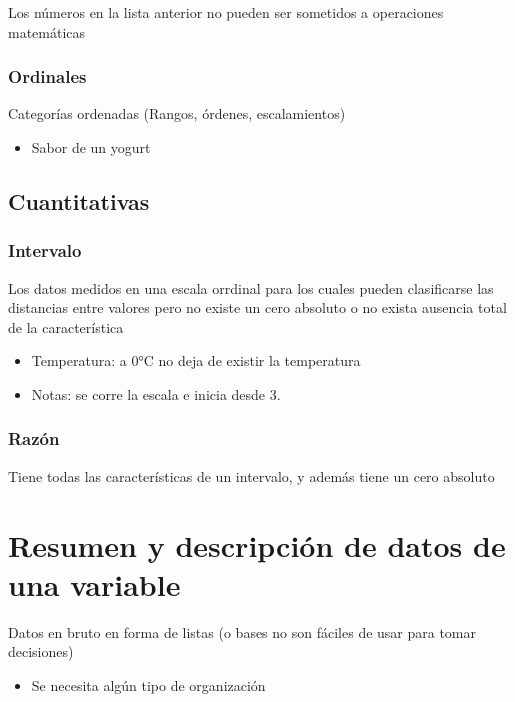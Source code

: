 \documentclass[twocolumn]{article}
\providecommand{\tightlist}{%
  \setlength{\itemsep}{0pt}\setlength{\parskip}{0pt}}
\begin{document}
Los números en la lista anterior no pueden ser sometidos a operaciones
matemáticas

\subsubsection{Ordinales}\label{ordinales}

Categorías ordenadas (Rangos, órdenes, escalamientos)

\begin{itemize}
\tightlist
\item
  Sabor de un yogurt
\end{itemize}

\subsection{Cuantitativas}\label{cuantitativas-1}

\subsubsection{Intervalo}\label{intervalo}

Los datos medidos en una escala orrdinal para los cuales pueden
clasificarse las distancias entre valores pero no existe un cero
absoluto o no exista ausencia total de la característica

\begin{itemize}
\tightlist
\item
  Temperatura: a 0°C no deja de existir la temperatura
\item
  Notas: se corre la escala e inicia desde 3.
\end{itemize}

\subsubsection{Razón}\label{razuxf3n}

Tiene todas las características de un intervalo, y además tiene un cero
absoluto

\section{Resumen y descripción de datos de una
variable}\label{resumen-y-descripciuxf3n-de-datos-de-una-variable}

Datos en bruto en forma de listas (o bases no son fáciles de usar para
tomar decisiones)

\begin{itemize}
\tightlist
\item
  Se necesita algún tipo de organización
\end{itemize}
\end{document}
